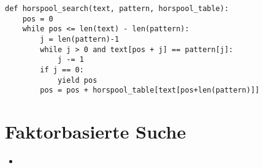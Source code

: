 \documentclass[11pt]{article}
\begin{document}
\begin{lstlisting}
def horspool_search(text, pattern, horspool_table):
    pos = 0
    while pos <= len(text) - len(pattern):
        j = len(pattern)-1
        while j > 0 and text[pos + j] == pattern[j]:
            j -= 1
        if j == 0:
            yield pos
        pos = pos + horspool_table[text[pos+len(pattern)]]
\end{lstlisting}

\clearpage

\section{Faktorbasierte Suche}

\begin{itemize}
	\item 
\end{itemize}
\end{document}
